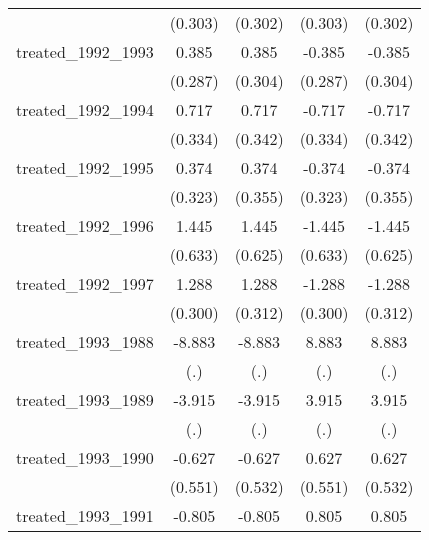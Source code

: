 {\begin{tabular}{l*{4}{c}}
            &     (0.303)         &     (0.302)         &     (0.303)         &     (0.302)         \\
[1em]
treated\_1992\_1993&       0.385         &       0.385         &      -0.385         &      -0.385         \\
            &     (0.287)         &     (0.304)         &     (0.287)         &     (0.304)         \\
[1em]
treated\_1992\_1994&       0.717\sym{*}  &       0.717\sym{*}  &      -0.717\sym{*}  &      -0.717\sym{*}  \\
            &     (0.334)         &     (0.342)         &     (0.334)         &     (0.342)         \\
[1em]
treated\_1992\_1995&       0.374         &       0.374         &      -0.374         &      -0.374         \\
            &     (0.323)         &     (0.355)         &     (0.323)         &     (0.355)         \\
[1em]
treated\_1992\_1996&       1.445\sym{*}  &       1.445\sym{*}  &      -1.445\sym{*}  &      -1.445\sym{*}  \\
            &     (0.633)         &     (0.625)         &     (0.633)         &     (0.625)         \\
[1em]
treated\_1992\_1997&       1.288\sym{***}&       1.288\sym{***}&      -1.288\sym{***}&      -1.288\sym{***}\\
            &     (0.300)         &     (0.312)         &     (0.300)         &     (0.312)         \\
[1em]
treated\_1993\_1988&      -8.883         &      -8.883         &       8.883         &       8.883         \\
            &         (.)         &         (.)         &         (.)         &         (.)         \\
[1em]
treated\_1993\_1989&      -3.915         &      -3.915         &       3.915         &       3.915         \\
            &         (.)         &         (.)         &         (.)         &         (.)         \\
[1em]
treated\_1993\_1990&      -0.627         &      -0.627         &       0.627         &       0.627         \\
            &     (0.551)         &     (0.532)         &     (0.551)         &     (0.532)         \\
[1em]
treated\_1993\_1991&      -0.805         &      -0.805         &       0.805         &       0.805         \\

\end{tabular}}
